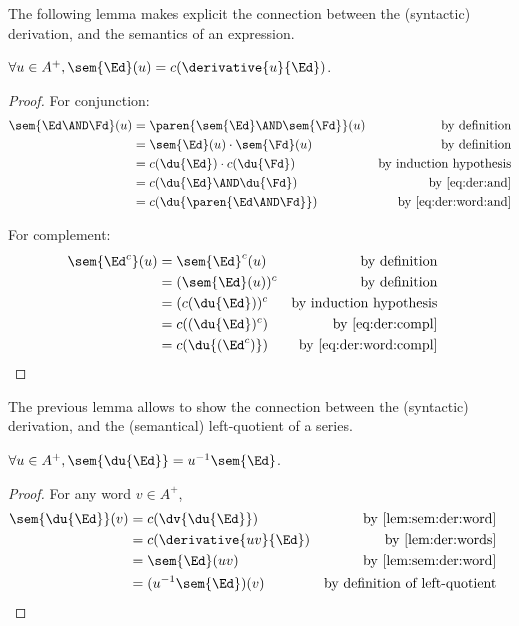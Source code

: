 \documentclass[a4paper,USenglish]{lipics}
\begin{document}
The following lemma makes explicit the connection between the (syntactic)
derivation, and the semantics of an expression.

\begin{Lemma}
  \label{lem:sem:der:word}
  $\forall u \in A^+, \sem{\Ed}(u) = c(\derivative{u}{\Ed})$.
\end{Lemma}

\begin{proof}
  For conjunction:
  \begin{align*}
    \sem{\Ed\AND\Fd}(u)
    &= \paren{\sem{\Ed}\AND\sem{\Fd}}(u) & \text{by definition} \\
    &= \sem{\Ed}(u) \cdot \sem{\Fd}(u)   & \text{by definition} \\
    &= c(\du{\Ed}) \cdot c(\du{\Fd})     & \text{by induction hypothesis} \\
    &= c(\du{\Ed} \AND \du{\Fd})         & \text{by \cref{eq:der:and}} \\
    &= c(\du{\paren{\Ed \AND \Fd}})      & \text{by \cref{eq:der:word:and}}
  \end{align*}

  For complement:
  \begin{align*}
    \sem{\Ed^c}(u)
    &= \sem{\Ed}^c(u)    & \text{by definition} \\
    &= (\sem{\Ed}(u))^c  & \text{by definition} \\
    &= (c(\du{\Ed}))^c   & \text{by induction hypothesis} \\
    &= c((\du{\Ed})^c)   & \text{by \cref{eq:der:compl}} \\
    &= c(\du{(\Ed^c)})   & \text{by \cref{eq:der:word:compl}}
    & \hfill\qedhere
  \end{align*}
\end{proof}


The previous lemma allows to show the connection between the (syntactic)
derivation, and the (semantical) left-quotient of a series.
\begin{theorem}
  \label{thm:sem:derivative}
  $\forall u \in A^+, \sem{\du{\Ed}} = u^{-1}\sem{\Ed}$.
\end{theorem}
\begin{proof}
  For any word $v \in A^+$,
  \begin{align*}
    \sem{\du{\Ed}}(v)
    &= c(\dv{\du{\Ed}})        & \text{by \cref{lem:sem:der:word}} \\
    &= c(\derivative{uv}{\Ed}) & \text{by \cref{lem:der:words}} \\
    &= \sem{\Ed}(uv)           & \text{by \cref{lem:sem:der:word}} \\
    &= (u^{-1}\sem{\Ed})(v)    & \text{by definition of left-quotient}
    & \hfill\qedhere
 \end{align*}
\end{proof}
\end{document}
